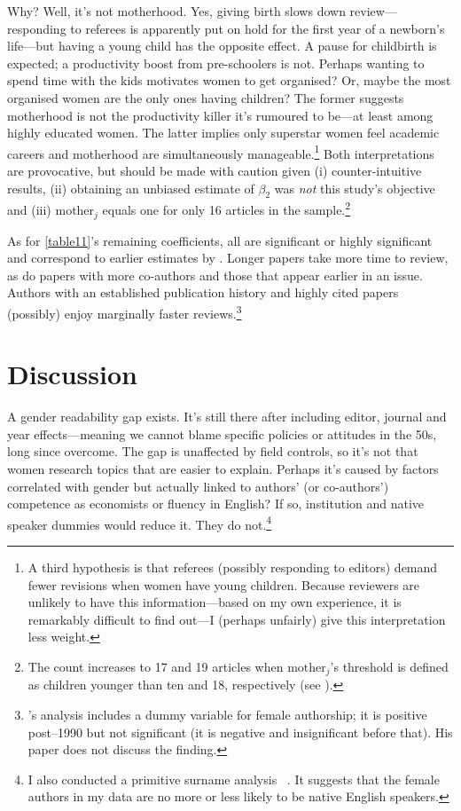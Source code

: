 Why? Well, it's not motherhood. Yes, giving birth slows down review---responding to referees is apparently put on hold for the first year of a newborn's life---but having a young child has the opposite effect. A pause for childbirth is expected; a productivity boost from pre-schoolers is not. Perhaps wanting to spend time with the kids motivates women to get organised? Or, maybe the most organised women are the only ones having children? The former suggests motherhood is not the productivity killer it's rumoured to be---at least among highly educated women. The latter implies only superstar women feel academic careers and motherhood are simultaneously manageable.\footnote{A third hypothesis is that referees (possibly responding to editors) demand fewer revisions when women have young children. Because reviewers are unlikely to have this information---based on my own experience, it is remarkably difficult to find out---I (perhaps unfairly) give this interpretation less weight.} Both interpretations are provocative, but should be made with caution given (i) counter-intuitive results, (ii) obtaining an unbiased estimate of $\beta_2$ was \emph{not} this study's objective and (iii) $\text{mother}_j$ equals one for only 16 articles in the sample.\footnote{The count increases to 17 and 19 articles when $\text{mother}_j$'s threshold is defined as children younger than ten and 18, respectively (see ).}

As for \autoref{table11}'s remaining coefficients, all are significant or highly significant and correspond to earlier estimates by  \citet{Ellison2002a}. Longer papers take more time to review, as do papers with more co-authors and those that appear earlier in an issue. Authors with an established publication history and highly cited papers (possibly) enjoy marginally faster reviews.\footnote{\citet{Ellison2002a}'s analysis includes a dummy variable for female authorship; it is positive post--1990 but not significant (it is negative and insignificant before that). His paper does not discuss the finding.} 

\section{Discussion}
\label{discussion}

A gender readability gap exists. It's still there after including editor, journal and year effects---meaning we cannot blame specific policies or attitudes in the 50s, long since overcome. The gap is unaffected by field controls, so it's not that women research topics that are easier to explain. Perhaps it's caused by factors correlated with gender but actually linked to authors' (or co-authors') competence as economists or fluency in English? If so, institution and native speaker dummies would reduce it. They do not.\footnote{I also conducted a primitive surname analysis ~\citep[see][pp. 35--36]{Hengel2016}. It suggests that the female authors in my data are no more or less likely to be native English speakers.}

